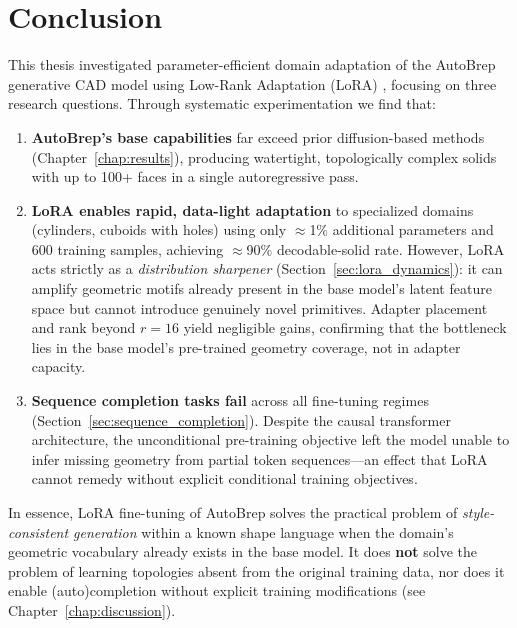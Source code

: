 \section{Conclusion}
\label{chap:conclusion}

This thesis investigated parameter-efficient domain adaptation of the AutoBrep generative CAD model \cite{Xu2025autobrep} using Low-Rank Adaptation (LoRA) \cite{Hu2021lora}, focusing on three research questions. Through systematic experimentation we find that:

\begin{enumerate}
	\item \textbf{AutoBrep's base capabilities} far exceed prior diffusion-based methods (Chapter~\ref{chap:results}), producing watertight, topologically complex solids with up to 100+ faces in a single autoregressive pass.
	
	\item \textbf{LoRA enables rapid, data-light adaptation} to specialized domains (cylinders, cuboids with holes) using only $\approx$1\% additional parameters and 600 training samples, achieving $\approx$90\% decodable-solid rate. However, LoRA acts strictly as a \emph{distribution sharpener} (Section~\ref{sec:lora_dynamics}): it can amplify geometric motifs already present in the base model's latent feature space but cannot introduce genuinely novel primitives. Adapter placement and rank beyond $r=16$ yield negligible gains, confirming that the bottleneck lies in the base model's pre-trained geometry coverage, not in adapter capacity.
	
	\item \textbf{Sequence completion tasks fail} across all fine-tuning regimes (Section~\ref{sec:sequence_completion}). Despite the causal transformer architecture, the unconditional pre-training objective left the model unable to infer missing geometry from partial token sequences---an effect that LoRA cannot remedy without explicit conditional training objectives.
\end{enumerate}

\par

In essence, LoRA fine-tuning of AutoBrep solves the practical problem of \emph{style-consistent generation} within a known shape language when the domain's geometric vocabulary already exists in the base model. It does \textbf{not} solve the problem of learning topologies absent from the original training data, nor does it enable (auto)completion without explicit training modifications (see Chapter~\ref{chap:discussion}).
